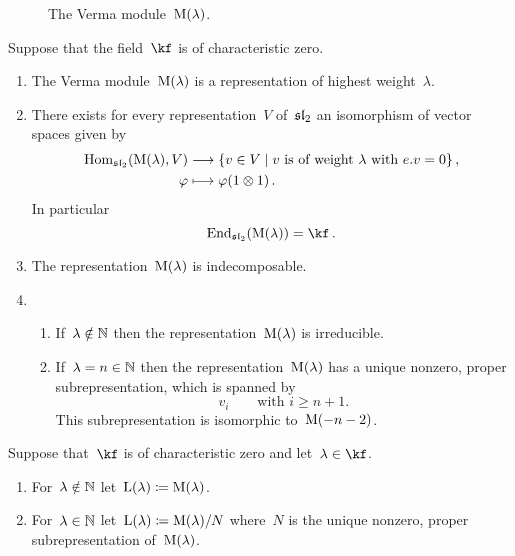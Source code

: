 \documentclass[a4paper, 11pt, oneside]{scrartcl}
\begin{document}
\begin{proposition}
\begin{enumerate}
\begin{figure}
\begin{center}
\begin{tikzpicture}[
              yscale = 1.3,
              bendy/.style = {bend right = 30},
              loopy/.style = {out = 190, in = 170, looseness = 30}
            ]
          \end{tikzpicture}
        \end{center}
        \caption{The Verma module~$\verma(\lambda)$.}
        \label{graphical representation of verma module}
      \end{figure}
  \end{enumerate}
  Suppose that the field~$\kf$ is of characteristic zero.
  \begin{enumerate}[resume*]
    \item
      The Verma module~$\verma(\lambda)$ is a representation of highest weight~$\lambda$.
    \item
      There exists for every representation~$V$ of~$\sllie_2$ an isomorphism of vector spaces given by
      \begin{align*}
        \Hom_{\sllie_2}( \verma(\lambda), V )
        &\longto
        \{
          v \in V
        \suchthat
          \text{$v$ is of weight~$\lambda$ with~$e.v = 0$}
        \} \,,
        \\
        \varphi
        &\longmapsto
        \varphi(1 \tensor 1) \,.
      \end{align*}
      In particular
      \[
        \End_{\sllie_2}( \verma(\lambda) )
        =
        \kf \,.
      \]
    \item
      The representation~$\verma(\lambda)$ is indecomposable.
    \item
      \begin{enumerate}
        \item
          If~$\lambda \notin \Natural$ then the representation~$\verma(\lambda)$ is irreducible.
        \item
          If~$\lambda = n \in \Natural$ then the representation~$\verma(\lambda)$ has a unique nonzero, proper subrepresentation, which is spanned by
          \[
            v_i
            \qquad
            \text{with~$i \geq n+1$.}
          \]
          This subrepresentation is isomorphic to~$\verma(-n-2)$.
      \end{enumerate}
  \end{enumerate}
\end{proposition}

\begin{definition}
  Suppose that~$\kf$ is of characteristic zero and let~$\lambda \in \kf$.
  \begin{enumerate}
    \item
      For~$\lambda \notin \Natural$ let~$\irred(\lambda) \defined \verma(\lambda)$.
    \item
      For~$\lambda \in \Natural$ let~$\irred(\lambda) \defined \verma(\lambda)/N$ where~$N$ is the unique nonzero, proper subrepresentation of~$\verma(\lambda)$.
  \end{enumerate}
\end{definition}
\end{document}
